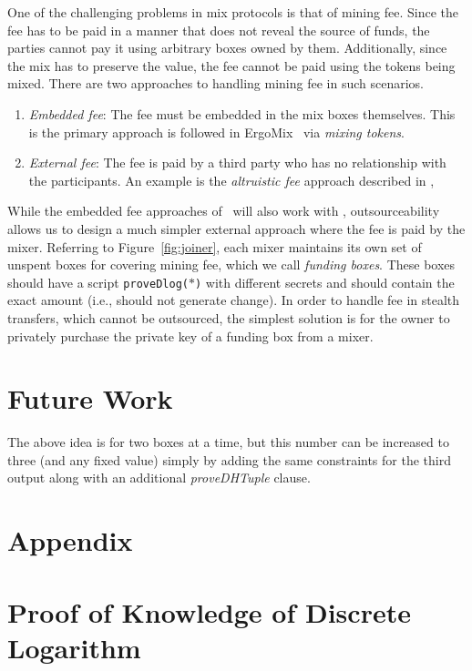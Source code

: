\documentclass[runningheads]{llncs}
\newcommand{\ergomix}{ErgoMix\xspace}
\begin{document}
One of the challenging problems in mix protocols is that of mining fee. Since the fee has to be paid in a manner that does not reveal the source of funds, the parties cannot pay it using arbitrary boxes owned by them. Additionally, since the mix has to preserve the value, the fee cannot be paid using the tokens being mixed. There are two approaches to handling mining fee in such scenarios.
\begin{enumerate}
    \item {\em Embedded fee}: The fee must be embedded in the mix boxes themselves. This is the primary approach is followed in \ergomix~\cite{zerojoin} via {\em mixing tokens}. 
    \item {\em External fee}: The fee is paid by a third party who has no relationship with the participants. An example is the {\em altruistic fee} approach described in \cite{zerojoin},
\end{enumerate}

While the embedded fee approaches of~\cite{zerojoin} will also work with \algname, outsourceability allows us to design a much simpler external approach where the fee is paid by the mixer. Referring to Figure~\ref{fig:joiner}, each mixer maintains its own set of unspent boxes for covering mining fee, which we call {\em funding boxes}. These boxes should have a script \texttt{proveDlog($*$)} with different secrets and should contain the exact amount (i.e., should not generate change). In order to handle fee in stealth transfers, which cannot be outsourced, the simplest solution is for the owner to privately purchase the private key of a funding box from a mixer.


\section{Future Work}

The above idea is for two boxes at a time, but this number can be increased to three (and any fixed value) simply by adding the same constraints for the third output along with an additional {\em proveDHTuple} clause.




\appendix

\section*{Appendix}

\section{Proof of Knowledge of Discrete Logarithm} 
\label{provedlog}
\end{document}
